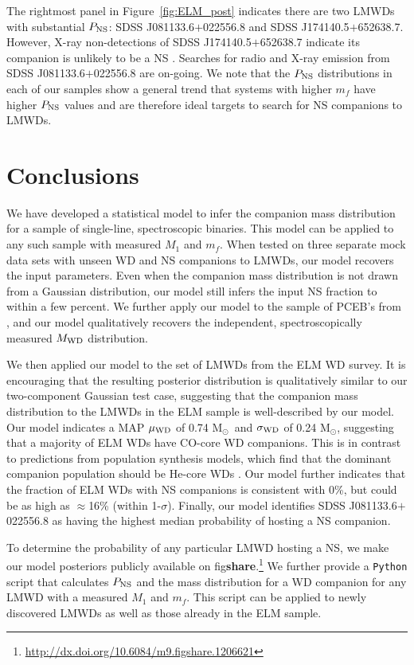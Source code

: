 \documentclass[apjl]{emulateapj}
\newcommand{\Msun}{\ifmmode {{\rm M}_{\odot}}\else M$_{\odot}$\fi}
\newcommand{\mf}{m_f}
\begin{document}
The rightmost panel in Figure~\ref{fig:ELM_post} indicates there are two LMWDs with substantial $P_{\rm NS}$: SDSS J081133.6$+$022556.8 and SDSS J174140.5$+$652638.7. However, X-ray non-detections of SDSS J174140.5$+$652638.7 indicate its companion is unlikely to be a NS \citep{kilic14}. Searches for radio and X-ray emission from SDSS J081133.6$+$022556.8 are on-going. We note that the $P_{\rm NS}$ distributions in each of our samples show a general trend that systems with higher $\mf$ have higher $P_{\rm NS}$ values and are therefore ideal targets to search for NS companions to LMWDs.

\section{Conclusions}
We have developed a statistical model to infer the companion mass distribution for a sample of single-line, spectroscopic binaries. This model can be applied to any such sample with measured $M_1$ and $\mf$. When tested on three separate mock data sets with unseen WD and NS companions to LMWDs, our model recovers the input parameters. Even when the companion mass distribution is not drawn from a Gaussian distribution, our model still infers the input NS fraction to within a few percent. We further apply our model to the sample of PCEB's from \citet{nebot11}, and our model qualitatively recovers the independent, spectroscopically measured $M_{\rm WD}$ distribution. 


We then applied our model to the set of LMWDs from the ELM WD survey. It is encouraging that the resulting posterior distribution is qualitatively similar to our two-component Gaussian test case, suggesting that the companion mass distribution to the LMWDs in the ELM sample is well-described by our model. Our model indicates a MAP $\mu_{\rm WD}$ of 0.74 \Msun\ and $\sigma_{\rm WD}$ of 0.24 \Msun, suggesting that a majority of ELM WDs have CO-core WD companions. This is in contrast to predictions from population synthesis models, which find that the dominant companion population should be He-core WDs \citep[e.g.,][]{toonen12}. Our model further indicates that the fraction of ELM WDs with NS companions is consistent with 0\%, but could be as high as $\approx$16\% (within 1-$\sigma$). Finally, our model identifies SDSS J081133.6$+$022556.8 as having the highest median probability of hosting a NS companion.

To determine the probability of any particular LMWD hosting a NS, we make our model posteriors publicly available on fig{\bf share}.\footnote{\url{http://dx.doi.org/10.6084/m9.figshare.1206621}} We further provide a {\tt Python} script that calculates $P_{\rm NS}$ and the mass distribution for a WD companion for any LMWD with a measured $M_1$ and $\mf$. This script can be applied to newly discovered LMWDs as well as those already in the ELM sample.
\end{document}

